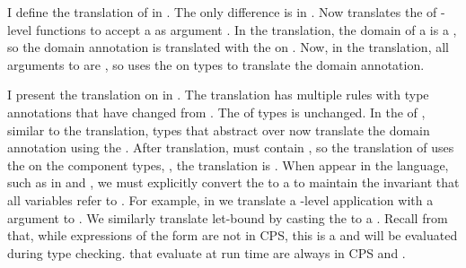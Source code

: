 \FigCBVKinds
I define the translation of  in .
The only difference is in .
Now  translates the  of -level functions
\im{\spity{\sx}{\sA}{\sK}} to accept a \emph{} as argument \im{\cpsx :
  \sA^+}.
In the  translation, the domain of a  is a
, so the domain annotation is translated with the
 on .
Now, in the  translation, all arguments to 
are , so  uses the  on
types to translate the domain annotation.

\FigCBVTypesShort
I present the translation on  in .
The  translation has multiple rules with type annotations that have
changed from .
The  of types is unchanged.
In the  of , similar to the 
translation,  types that abstract over  now
translate the domain annotation \im{\sx:\sA} using the .
After  translation,  must contain ,
so the translation of \im{\ssigmaty{\sx}{\sA}{\sB}} uses the  on the component types, \ie, the  translation is
\im{\cpssigmaty{\cpsx}{\sA^+}{\sB^+}}.
When  appear in the  language, such as in
 and , we must explicitly convert the
 to a  to maintain the invariant that all
 variables refer to .
For example, in  we translate a -level application
with a  argument \im{\sappe{\sA}{\se}} to
\im{\cpsappe{\sA^+}{(\cpsncappe{\se^\div}{\sB^+}{\cpsidk})}}.
We similarly translate let-bound   by casting the
 to a .
Recall from  that, while expressions of the form
\im{\cpsappe{\sA^+}{(\cpsncappe{\se^\div}{\sB^+}{\cpsidk})}} are not in CPS,
this  is a  and will be evaluated during type
checking.
 that evaluate at run time are always in CPS and .

